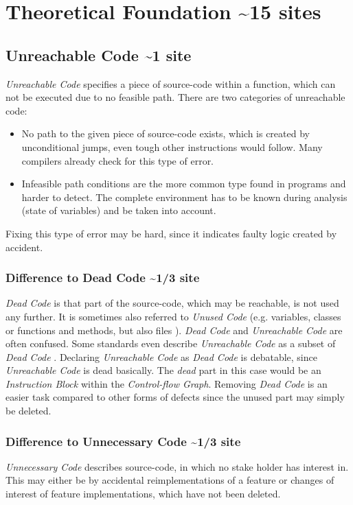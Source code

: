 
\chapter {Theoretical Foundation \textasciitilde 15 sites}
\label {cha:theoretical foundation}

\section{Unreachable Code \textasciitilde 1 site}
\emph{Unreachable Code} specifies a piece of source-code within a function, which can not be executed due to no feasible path.
There are two categories of unreachable code:
\begin{itemize}
	\item No path to the given piece of source-code exists, which is created by unconditional jumps, even tough other instructions would follow. 
	Many compilers already check for this type of error.
	\item Infeasible path conditions are the more common type found in programs and harder to detect. The complete environment has to be known during analysis (state of variables) and be taken into account. 
\end{itemize}

Fixing this type of error may be hard, since it indicates faulty logic created by accident. 

\subsection{Difference to Dead Code \textasciitilde 1/3 site}
\emph{Dead Code} is that part of the source-code, which may be reachable, is not used any further. It is sometimes also referred to \emph{Unused Code}
(e.g. variables, classes or functions and methods, but also files \cite{Boomsma_2012}).
\emph{Dead Code} and \emph{Unreachable Code} are often confused. Some standards even describe \emph{Unreachable Code} as a subset of \emph{Dead Code} \cite{CWECWE561Dead}.
Declaring \emph{Unreachable Code} as \emph{Dead Code} is debatable, since \emph{Unreachable Code} is dead basically. The \emph{dead} part in this case would be an \emph{Instruction Block} within the \emph{Control-flow Graph}.
Removing \emph{Dead Code} is an easier task compared to other forms of defects since the unused part may simply be deleted.
\subsection{Difference to Unnecessary Code \textasciitilde 1/3 site}
\emph{Unnecessary Code} describes source-code, in which no stake holder has interest in. This may either be by accidental reimplementations of a feature or changes of interest of feature implementations, which have not been deleted\cite{Haas_2020}.


